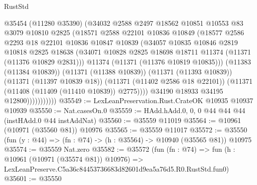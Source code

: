 \begin{lexlean}{RustStd}
\begin{coremodule}
                        @35454
                        (@11280 @35390)
                        (@34032
                          @2588
                          @2497
                          @18562
                          @10851
                          @10553
                          @83
                          @3079
                          @10810
                          @2825
                          (@18571
                            @2588
                            @22101
                            @10836
                            @10849
                            (@18577
                              @2586
                              @2293
                              @18
                              @22101
                              @10836
                              @10847
                              @10839
                              (@34057
                                @10835
                                @10846
                                @2819
                                @10818
                                @2825
                                @18638
                                (@34071
                                  @10828
                                  @2825
                                  @18698
                                  @18711
                                  @11374
                                  (@11371 (@11376 @10829 @2831)))
                                @11374
                                (@11371 (@11376 @10819 @10835)))
                              (@11383 (@11384 @10839))
                              (@11371 (@11388 @10839))
                              (@11371 (@11393 @10839))
                              (@11371 (@11397 @10839 @18))
                              (@11371 (@11402 @2586 @18 @22101))
                              (@11371 (@11408 (@11409 (@11410 @10839)) @2775))))
                          @34190
                          @18933
                          @34195
                          @12800)))))))))))
@35549 := LexLeanPreservation.Rust.CrateOK @10935 @10937 @10939
@35550 := Nat.casesOn.{0}
@35559 := HAdd.hAdd.{0, 0, 0} @44 @44 @44 (instHAdd.{0} @44 instAddNat)
@35560 := @35559 @11019
@35564 := @10961 (@10971 (@35560 @81)) @10976
@35565 := @35559 @11017
@35572 := @35550 (fun (y : @44) => (fn : @74) -> (h : @35564) -> @10940 (@35565 @81)) @10975
@35574 := @35559 Nat.zero
@35582 := @35572
    (fun (fn : @74) =>
    fun (h : @10961 (@10971 (@35574 @81)) @10976) =>
    LexLeanPreserve.C5a36c84453736683d82601d9ea5a76d5.R0.RustStd.fun0)
@35601 := @35550

\end{coremodule}
\end{lexlean}
